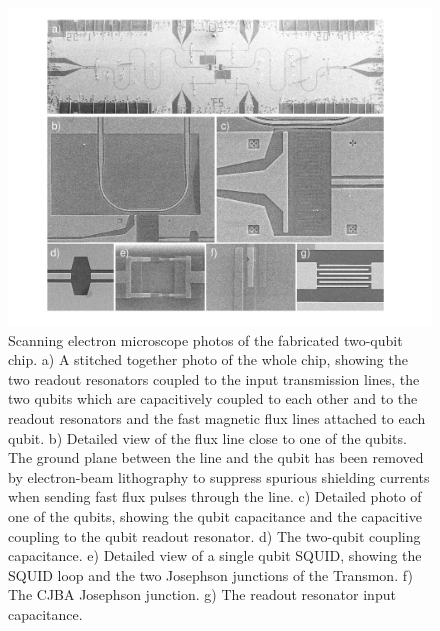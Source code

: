 \begin{figure}[p!]
	\includegraphics[width=1\textwidth]{"./material/figures/2-qubit-processor/processor photos"}
	\caption{Scanning electron microscope photos of the fabricated two-qubit chip. a) A stitched together photo of the whole chip, showing the two readout resonators coupled to the input transmission lines, the two qubits which are capacitively coupled to each other and to the readout resonators and the fast magnetic flux lines attached to each qubit. b) Detailed view of the flux line close to one of the qubits. The ground plane between the line and the qubit has been removed by electron-beam lithography to suppress spurious shielding currents when sending fast flux pulses through the line. c) Detailed photo of one of the qubits, showing the qubit capacitance and the capacitive coupling to the qubit readout resonator. d) The two-qubit coupling capacitance. e) Detailed view of a single qubit SQUID, showing the SQUID loop and the two Josephson junctions of the Transmon. f) The CJBA Josephson junction. g) The readout resonator input capacitance.}
	\label{fig:qubit_chip_photos}
\end{figure}

